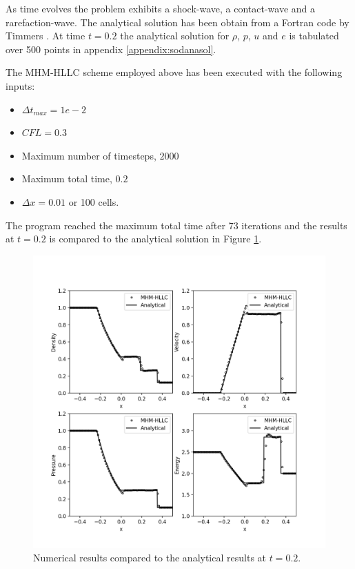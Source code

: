 \documentclass[10pt,letterpaper,notitlepage]{article}
\numberwithin{equation}{section}
\begin{document}
As time evolves the problem exhibits a shock-wave, a contact-wave and a rarefaction-wave. The analytical solution has been obtain from a Fortran code by Timmers \cite{Timmers}. At time $t=0.2$ the analytical solution for $\rho$, $p$, $u$ and $e$ is tabulated over 500 points in appendix \ref{appendix:sodanasol}.

The MHM-HLLC scheme employed above has been executed with the following inputs:
\begin{itemize}
	\item $\Delta t_{max}=1e-2$
	\item $CFL=0.3$
	\item Maximum number of timesteps, $2000$
	\item Maximum total time, $0.2$
	\item $\Delta x=0.01$ or 100 cells.
\end{itemize}
The program reached the maximum total time after 73 iterations and the results at $t=0.2$ is compared to the analytical solution in Figure \ref{fig:compinfflow1dtest1output}.

\begin{figure}[H]
	\centering
	\includegraphics[width=1.0\linewidth]{figures/CompInFFlow1D_Test1_output.png}
	\caption{Numerical results compared to the analytical results at $t=0.2$.}
	\label{fig:compinfflow1dtest1output}
\end{figure}
\end{document}
